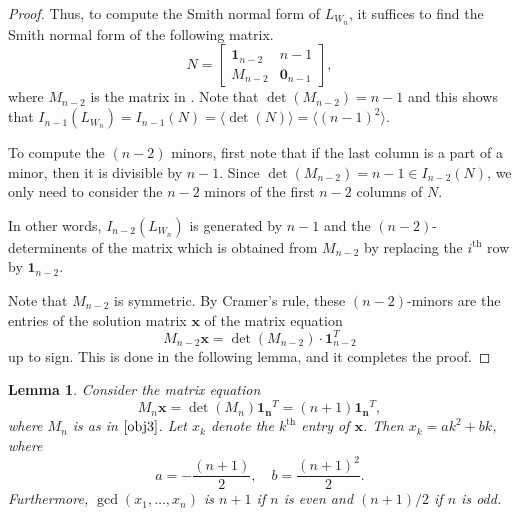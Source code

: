 \documentclass[11pt,reqno]{amsart}
\newcommand{\angles}[1]{\langle #1 \rangle}
\theoremstyle{definition}
\theoremstyle{plain}
\newtheorem{lemma}[mydef]{Lemma}
\begin{document}
\begin{proof}
\noindent Thus, to compute the Smith normal form of $L_{W_n}$, it suffices to find the Smith normal form of the following matrix.
\begin{equation*}
N = \left[
	\begin{array}{c|c}
	\mathbf{1}_{n-2} & n-1 \\
	\hline
	M_{n-2} & \mathbf{0}_{n-1}
	\end{array}
\right],
\end{equation*}
where $M_{n-2}$ is the matrix in . 
Note that $\det(M_{n-2}) = n-1$ and this shows that $I_{n-1}(L_{W_n}) = I_{n-1}(N) = \angles{\det(N)}=\angles{(n-1)^2}$.

To compute the $(n-2)$ minors, first note that if the last column is a part of a minor, then it is divisible by $n-1$. 
Since $\det(M_{n-2}) = n-1 \in I_{n-2}(N)$, we only need to consider the $n-2$ minors of the first $n-2$ columns of $N$. 

In other words, $I_{n-2}(L_{W_n})$ is generated by $n-1$ 
and the $(n-2)$-determinents of the matrix which is obtained from $M_{n-2}$ by replacing the $i^{\textrm{th}}$ row by $\mathbf{1}_{n-2}$.

Note that $M_{n-2}$ is symmetric. 
By Cramer's rule, these $(n-2)$-minors are the entries of the solution matrix $\mathbf{x}$ of the matrix equation
\begin{equation*}
M_{n-2} \mathbf{x} 
= \det(M_{n-2}) \cdot \mathbf{1}_{n-2}^T
\end{equation*}
up to sign.
This is done in the following lemma, and it completes the proof.
\end{proof}

\begin{lemma}\label{M_nCremer}
Consider the matrix equation 
\begin{equation*}
M_n \mathbf{x} 
= \det(M_n) \mathbf{1_n}^T
= (n+1) \mathbf{1_n}^T,
\end{equation*}
where $M_n$ is as in $\Cref{obj3}$. 
Let $x_k$ denote the $k^{\textrm{th}}$ entry of $\mathbf{x}$. Then $x_k = a k^2 + b k$, where
\[
a = -\frac{(n+1)}{2}, \quad b = \frac{(n+1)^2}{2}.
\]
Furthermore, $\gcd(x_1,\dots, x_n)$ is $n+1$ if $n$ is even and $(n+1)/2$ if $n$ is odd. 
\end{lemma}
\end{document}
